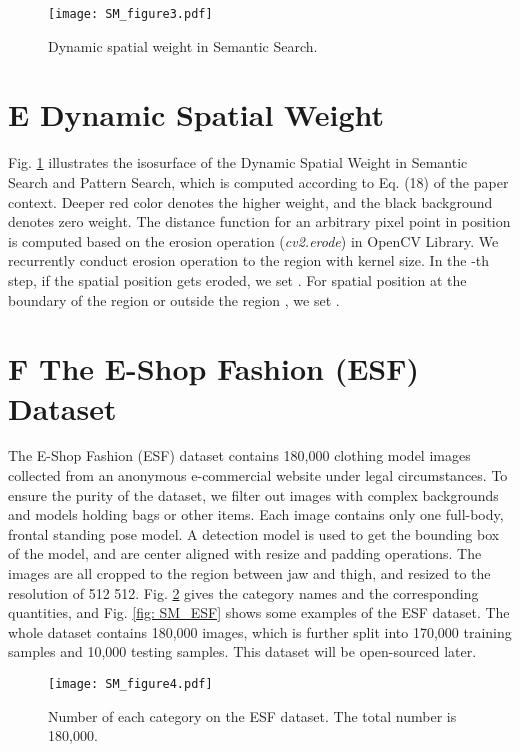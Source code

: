 \documentclass[10pt,twocolumn,letterpaper]{article}
\begin{document}
\begin{figure}[h]
  \centering
  \texttt{[image: SM\_figure3.pdf]}
  \caption{Dynamic spatial weight  in Semantic Search.}\label{fig: dynamic_W}
\end{figure}

\section*{E Dynamic Spatial Weight}
Fig. \ref{fig: dynamic_W} illustrates the isosurface of the Dynamic Spatial Weight  in Semantic Search and Pattern Search, which is computed according to Eq. (18) of the paper context. Deeper red color denotes the higher weight, and the black background denotes zero weight. 
The distance function  for an arbitrary pixel point in position  is computed based on the erosion operation (\textit{cv2.erode}) in OpenCV Library. We recurrently conduct erosion operation to the region  with  kernel size. In the -th step, if the spatial position  gets eroded, we set . For spatial position  at the boundary of the region  or outside the region , we set .




\section*{F The E-Shop Fashion (ESF) Dataset }
The E-Shop Fashion (ESF) dataset contains 180,000 clothing model images collected from an anonymous e-commercial website under legal circumstances. To ensure the purity of the dataset, we filter out images with complex backgrounds and models holding bags or other items. Each image contains only one full-body, frontal standing pose model.
A detection model is used to get the bounding box of the model, and are center aligned with resize and padding operations. The images are all cropped to the region between jaw and thigh, and resized to the resolution of 512  512. Fig. \ref{fig: SM_sta_cloth} gives the category names and the corresponding quantities, and Fig. \ref{fig: SM_ESF} shows some examples of the ESF dataset. The whole dataset contains 180,000 images, which is further split into 170,000 training samples and 10,000 testing samples. This dataset will be open-sourced later.

\begin{figure}[h]
  \centering
  \texttt{[image: SM\_figure4.pdf]}
  \caption{Number of each category on the ESF dataset. The total number is 180,000.}\label{fig: SM_sta_cloth}
\end{figure}
\end{document}
